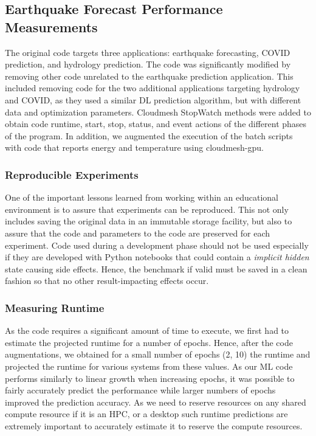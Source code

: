 \documentclass[utf8]{FrontiersinVancouver} %
\newcommand{\TODO}[2]{\todo[inline]{{\bf \color{red} #1} #2}}
\begin{document}

\subsection{Earthquake Forecast Performance Measurements}
\label{sec:perf-main}

The original code targets three applications: earthquake forecasting, COVID prediction, and hydrology prediction.
The code was significantly modified by removing other code unrelated to the earthquake prediction application. This included
removing code for the two additional applications targeting hydrology and COVID, as they used a similar DL prediction algorithm, but with different data and optimization
parameters. Cloudmesh StopWatch methods were added to obtain code
runtime, start, stop, status, and event actions of the different phases of the program. In addition, we
augmented the execution of the batch scripts with code that reports
energy and temperature using cloudmesh-gpu.


\subsubsection{Reproducible Experiments}

One of the important lessons learned from working within an educational environment is to assure that experiments can be reproduced. This not only includes saving the original data in an immutable storage facility, but also to assure that the code and parameters to the code are preserved for each experiment. Code used during a development phase should not be used especially if they are developed with Python notebooks that could contain a {\em implicit hidden} state causing side effects. Hence, the benchmark if valid must be saved in a clean fashion so that no other result-impacting effects occur. 

\subsubsection{Measuring Runtime}
\label{sec:perf-runtime}

As the code requires a significant amount of time to execute, we first had to estimate the projected runtime for a number of epochs. Hence, after the code augmentations, we obtained for a small number of epochs (2, 10) the runtime and  projected the runtime for 
various systems from these values. 
As our ML code
performs similarly to linear growth when increasing epochs, it was
possible to fairly accurately predict the performance while larger numbers of epochs improved the prediction accuracy. As we need to reserve resources on any shared compute resource if it is an HPC, or a desktop such runtime predictions are extremely important to accurately estimate it to reserve the compute resources.
\end{document}
